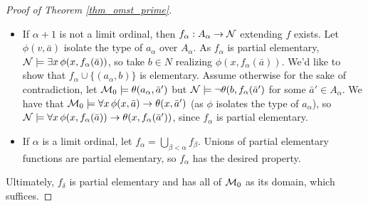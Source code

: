 \begin{proof}[Proof of Theorem \ref{thm_omst_prime}]
\begin{itemize}
\item If \(\alpha + 1\) is not a limit ordinal, then \(f_\alpha: A_\alpha \to \mathcal{N}\) extending \(f\) exists. 
Let \(\phi(v, \bar{a})\) isolate the type of \(a_\alpha\) over \(A_\alpha\). 
As \(f_\alpha\) is partial elementary, \(\mathcal{N} \models \exists x \, \phi(x, f_\alpha(\bar{a}))\), so take \(b \in N\) realizing \(\phi(x, f_\alpha(\bar{a}))\).
We'd like to show that \(f_\alpha \cup \{(a_\alpha, b)\}\) is elementary. 
Assume otherwise for the sake of contradiction, let \(\mathcal{M}_0 \models \theta(a_\alpha, \bar{a}')\) but \(\mathcal{N} \models \neg\theta(b, f_\alpha(\bar{a}')\) for some \(\bar{a}' \in A_\alpha\). 
We have that \(\mathcal{M}_0 \models \forall x \, \phi(x, \bar{a}) \to \theta(x, \bar{a}')\) (as \(\phi\) isolates the type of \(a_\alpha\)), so \(\mathcal{N}\models\forall x \, \phi(x, f_\alpha(\bar{a})) \to \theta(x, f_\alpha(\bar{a}'))\), since \(f_\alpha\) is partial elementary.

\item If \(\alpha\) is a limit ordinal, let \(f_\alpha = \bigcup\limits_{\beta < \alpha}f_\beta\). Unions of partial elementary functions are partial elementary, so \(f_\alpha\) has the desired property.
\end{itemize}
 
\noindent Ultimately, \(f_\delta\) is partial elementary and has all of \(\mathcal{M}_0\) as its domain, which suffices. 
\end{proof}

